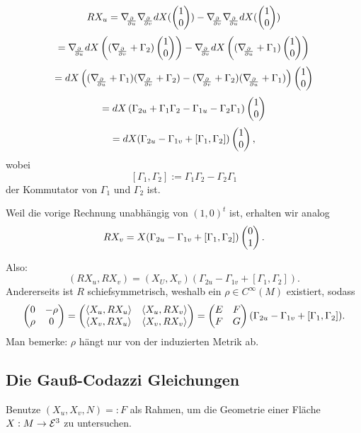 		\[ RX_u = \D{u}\D v dX(\pmat{1 \\ 0}) - \D v \D u dX(\pmat{1\\0}) \]
		\[ = \D u dX\left((\D v + \Gamma_2) \pmat{1 \\ 0}\right) - \D v dX \left( (\D u + \Gamma_1)\pmat{1\\0}  \right) \]
		\[ = dX\left((\D u + \Gamma_1)(\D v + \Gamma_2)-(\D v + \Gamma_2) (\D u + \Gamma_{1} )\right) \pmat{1 \\ 0} \]
		\[ = dX\left( \Gamma_{2u} + \Gamma_1\Gamma_2 - \Gamma_{1u} - \Gamma_{2}\Gamma_{1} \right) \begin{pmatrix} 1 \\ 0 \end{pmatrix} \]
		\[ = dX (\Gamma_{2u}-\Gamma_{1v} + [\Gamma_{1},\Gamma_{2}]) \begin{pmatrix} 1 \\ 0 \end{pmatrix}, \]
	wobei 
		\[ [\Gamma_1 , \Gamma_2] := \Gamma_1 \Gamma_2 - \Gamma_2 \Gamma_1 \]
	der Kommutator von $\Gamma_1 $ und $\Gamma_2$ ist.  
	
	Weil die vorige Rechnung unabhängig von $(1,0)^t$ ist, erhalten wir analog
		\[ RX_v = X (\Gamma_{2u}-\Gamma_{1v} + [\Gamma_{1},\Gamma_{2}])\begin{pmatrix} 0 \\ 1 \end{pmatrix}. \]
		
	Also: 
		\[ (RX_u,RX_v) = ( X_U,X_v )(\Gamma_{2u}-\Gamma_{1v} + [\Gamma_{1},\Gamma_{2}]). \]
	Andererseits ist $R$ schiefsymmetrisch, weshalb ein $ \rho \in C^\infty(M) $ existiert, sodass
		\[ \begin{pmatrix} 0 & -\rho \\ \rho & 0 \end{pmatrix} = \begin{pmatrix} \left \langle X_u,RX_u \right\rangle &\left \langle X_u,RX_v \right\rangle \\ \left \langle X_v,RX_u \right\rangle & \left \langle X_v,RX_v \right\rangle  \end{pmatrix} = \begin{pmatrix} E & F \\ F & G \end{pmatrix}(\Gamma_{2u}-\Gamma_{1v} + [ \Gamma_{1},\Gamma_{2} ]). \]
	Man bemerke:
	$ \rho $ hängt nur von der induzierten Metrik ab.
	
\subsection{Die Gauß-Codazzi Gleichungen}

	Benutze $ (X_u,X_v,N) =: F $ als Rahmen, um die Geometrie einer Fläche $ X:M\rightarrow\mathcal E^3 $ zu untersuchen.

